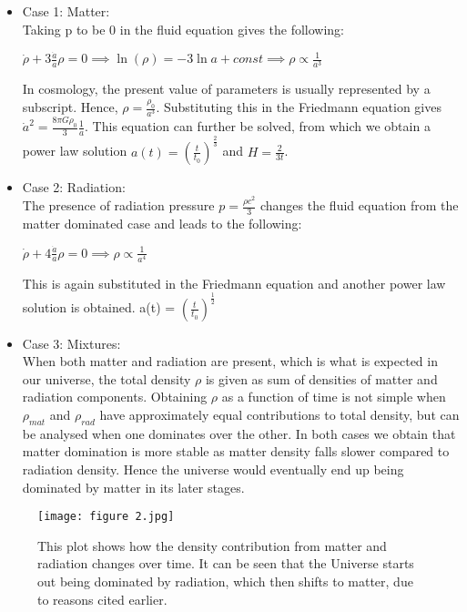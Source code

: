 \documentclass{article}
\begin{document}
\begin{itemize}
    \item Case 1: Matter: \\
    Taking p to be 0 in the fluid equation gives the following:
    \begin{center}
    \begin{math}
         \dot{\rho} + 3\frac{\dot{a}}{a}{\rho} = 0 \implies \ln(\rho) = -3\ln{a} + const \implies \rho \propto \frac{1}{a^3}
    \end{math}
    \end{center}
    In cosmology, the present value of parameters is usually represented by a subscript. Hence, 
    ${\rho}=\frac{{\rho}_0}{a^3}$. Substituting this in the Friedmann equation gives ${\dot{a}^2} = \frac{8{\pi}G{\rho_{0}}}{3}\frac{1}{a}$.
    This equation can further be solved, from which we obtain a power law solution $a(t)=(\frac{t}{t_0})^{\frac{2}{3}}$ and $H=\frac{2}{3t}$.
    \item Case 2: Radiation: \\
    The presence of radiation pressure $p = \frac{{\rho}c^2}{3}$ changes the fluid equation from the matter dominated case and leads to the following:
    \begin{center}
    \begin{math}
         \dot{\rho} + 4\frac{\dot{a}}{a}{\rho}=0 \implies \rho \propto \frac{1}{a^4}
    \end{math}
    \end{center}
    This is again substituted in the Friedmann equation and another power law solution is obtained. a(t) = $(\frac{t}{t_0})^{\frac{1}{2}}$
    \item Case 3: Mixtures: \\
    When both matter and radiation are present, which is what is expected in our universe, the total density $\rho$ is given as sum of densities of matter and radiation components. Obtaining $\rho$ as a function of time is not simple when $\rho_{mat}$ and $\rho_{rad}$ have approximately equal contributions to total density, but can be analysed when one dominates over the other. In both cases we obtain that matter domination is more stable as matter density falls slower compared to radiation density. Hence the universe would eventually end up being dominated by matter in its later stages.
\end{itemize}

\begin{figure}[H]
    \centering
    \texttt{[image: figure 2.jpg]}
    \caption{This plot shows how the density contribution from matter and radiation changes over time. It can be seen that the Universe starts out being dominated by radiation, which then shifts to matter, due to reasons cited earlier.}
    \label{fig:geometry}
\end{figure}
\end{document}

